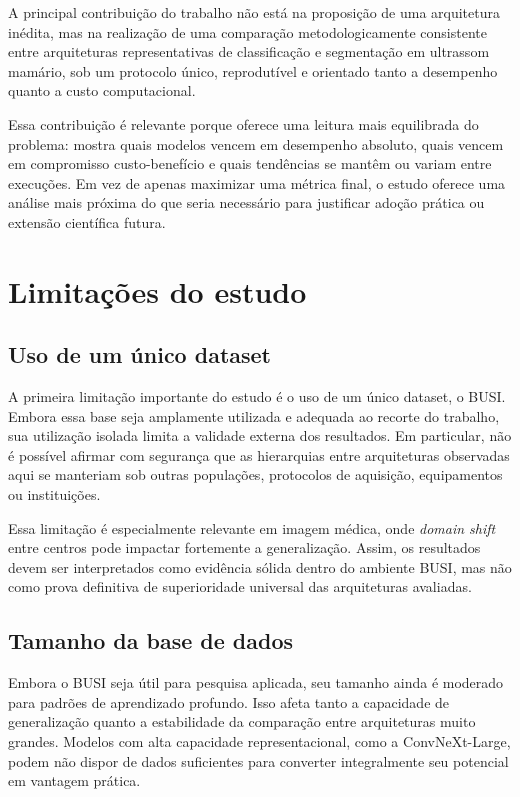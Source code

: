 \documentclass[tcc,capa]{texufpel}
\begin{document}
A principal contribuição do trabalho não está na proposição de uma arquitetura inédita, mas na realização de uma comparação metodologicamente consistente entre arquiteturas representativas de classificação e segmentação em ultrassom mamário, sob um protocolo único, reprodutível e orientado tanto a desempenho quanto a custo computacional.

Essa contribuição é relevante porque oferece uma leitura mais equilibrada do problema: mostra quais modelos vencem em desempenho absoluto, quais vencem em compromisso custo-benefício e quais tendências se mantêm ou variam entre execuções. Em vez de apenas maximizar uma métrica final, o estudo oferece uma análise mais próxima do que seria necessário para justificar adoção prática ou extensão científica futura.

\section{Limitações do estudo}

\subsection{Uso de um único dataset}

A primeira limitação importante do estudo é o uso de um único dataset, o BUSI. Embora essa base seja amplamente utilizada e adequada ao recorte do trabalho, sua utilização isolada limita a validade externa dos resultados. Em particular, não é possível afirmar com segurança que as hierarquias entre arquiteturas observadas aqui se manteriam sob outras populações, protocolos de aquisição, equipamentos ou instituições.

Essa limitação é especialmente relevante em imagem médica, onde \textit{domain shift} entre centros pode impactar fortemente a generalização. Assim, os resultados devem ser interpretados como evidência sólida dentro do ambiente BUSI, mas não como prova definitiva de superioridade universal das arquiteturas avaliadas.

\subsection{Tamanho da base de dados}

Embora o BUSI seja útil para pesquisa aplicada, seu tamanho ainda é moderado para padrões de aprendizado profundo. Isso afeta tanto a capacidade de generalização quanto a estabilidade da comparação entre arquiteturas muito grandes. Modelos com alta capacidade representacional, como a ConvNeXt-Large, podem não dispor de dados suficientes para converter integralmente seu potencial em vantagem prática.
\end{document}
